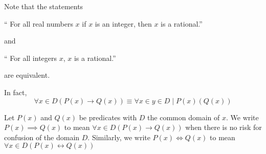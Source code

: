 






Note that the statements
\begin{center}
	`` For all real numbers $x$ if $x$ is an integer, then $x$ is a rational.''
\end{center}
and
\begin{center}
	`` For all integers $x$, $x$ is a rational.''
\end{center}
are equivalent.

In fact, \[\forall x\in D(P(x)\rightarrow Q(x) )\equiv \forall x\in {y\in D\mid P(x)}( Q(x) )\]


Let $P(x)$ and $Q(x)$ be predicates with $D$ the common domain of $x$.
We write $P(x)\implies Q(x)$ to mean $\forall x\in D( P(x)\rightarrow Q(x))$ when there is no risk for confusion of the domain $D$.
Similarly, we write $P(x)\iff Q(x)$ to mean $\forall x\in D( P(x)\leftrightarrow Q(x))$
